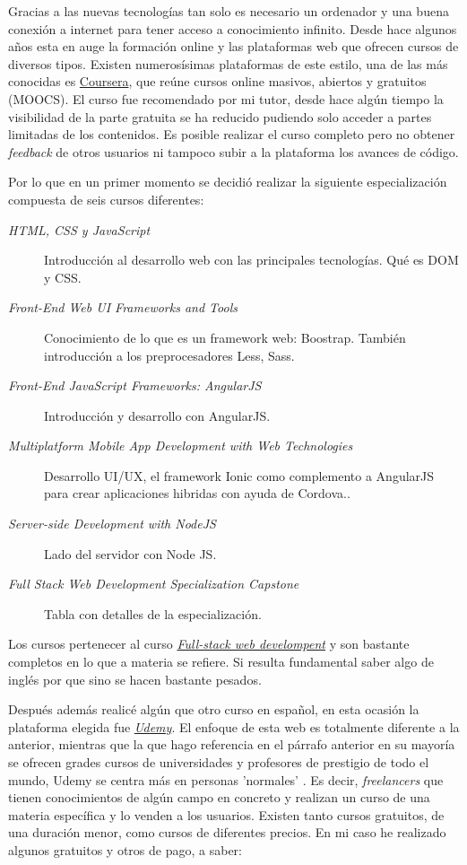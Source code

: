 Gracias a las nuevas tecnologías tan solo es necesario un ordenador y una buena conexión a internet para tener acceso a conocimiento infinito. Desde hace algunos años esta en auge la formación online y las plataformas web que ofrecen cursos de diversos tipos. Existen numerosísimas plataformas \cite{elearning} de este estilo, una de las más conocidas es  \hyperlink{www.coursera.org}{Coursera}, que reúne cursos online masivos, abiertos y gratuitos (MOOCS). El curso fue recomendado por mi tutor, desde hace algún tiempo la visibilidad de la parte gratuita se ha reducido pudiendo solo acceder a partes limitadas de los contenidos. Es posible realizar el curso completo pero no obtener \emph{feedback} de otros usuarios ni tampoco subir a la plataforma los avances de código.

Por lo que en un primer momento se decidió realizar la siguiente especialización compuesta de seis cursos diferentes:

\begin{description}
	\item[\emph{HTML, CSS y JavaScript}] Introducción al desarrollo web con las principales tecnologías. Qué es DOM y CSS.
	\item[ \emph{Front-End Web UI Frameworks and Tools}] Conocimiento de lo que es un framework web: Boostrap. También introducción a los preprocesadores Less, Sass.
	\item[\emph{Front-End JavaScript Frameworks: AngularJS} ]  Introducción y desarrollo con AngularJS.
	\item[ \emph{Multiplatform Mobile App Development with Web Technologies}] Desarrollo UI/UX, el framework Ionic como complemento a AngularJS para  crear aplicaciones hibridas con ayuda de Cordova..
	\item[ \emph{Server-side Development with NodeJS} ] Lado del servidor con Node JS.
	\item[ \emph{Full Stack Web Development Specialization Capstone}] Tabla con detalles de la especialización.
\end{description}


Los cursos pertenecer al curso \hyperlink{https://www.coursera.org/specializations/full-stack}{\emph{Full-stack web develompent}} y son bastante completos en lo que a materia se refiere. Si resulta fundamental saber algo de inglés por que sino se hacen bastante pesados.

Después además realicé algún que otro curso en español, en esta ocasión la plataforma elegida fue  \hyperlink{https://www.udemy.com/}{\emph{Udemy}}. El enfoque de esta web es totalmente diferente a la anterior, mientras que la que hago referencia en el párrafo anterior en su mayoría se ofrecen grades cursos de universidades y profesores de prestigio de todo el mundo, Udemy se centra más en personas 'normales' . Es decir, \emph{freelancers}  que tienen conocimientos de algún campo en concreto y realizan un curso de una materia específica y lo venden a los usuarios. Existen tanto cursos gratuitos, de una duración menor, como cursos de diferentes precios. En mi caso he realizado algunos gratuitos y otros de pago, a saber:  

